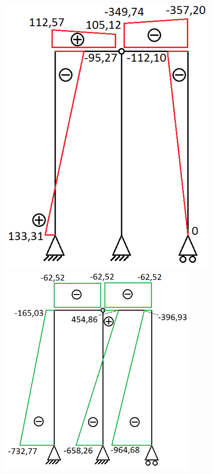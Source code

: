 \begin{figure}[H]\centering
	\begin{minipage}[b]{0.48\textwidth}\centering
		\includegraphics[width=1.1\textwidth]{billeder/sk.png} %
	\end{minipage}\hfill
	\begin{minipage}[b]{0.48\textwidth}\centering
		\includegraphics[width=0.9\textwidth]{billeder/SKFN.png} %

\end{minipage}
\end{figure}

